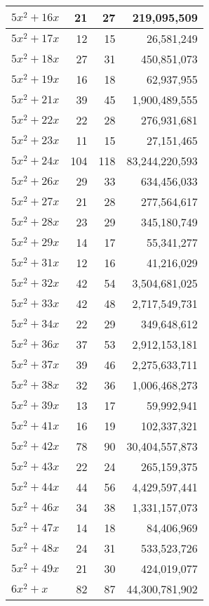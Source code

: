 \documentclass[a4paper]{amsproc}
\theoremstyle{plain}
\theoremstyle{named}
\begin{document}
\begin{longtable}{ | l | r | r | r | }
$5x^2 + 16x$ & 21 & 27 & 219{,}095{,}509 \\ \hline
$5x^2 + 17x$ & 12 & 15 & 26{,}581{,}249 \\ \hline
$5x^2 + 18x$ & 27 & 31 & 450{,}851{,}073 \\ \hline
$5x^2 + 19x$ & 16 & 18 & 62{,}937{,}955 \\ \hline
$5x^2 + 21x$ & 39 & 45 & 1{,}900{,}489{,}555 \\ \hline
$5x^2 + 22x$ & 22 & 28 & 276{,}931{,}681 \\ \hline
$5x^2 + 23x$ & 11 & 15 & 27{,}151{,}465 \\ \hline
$5x^2 + 24x$ & 104 & 118 & 83{,}244{,}220{,}593 \\ \hline
$5x^2 + 26x$ & 29 & 33 & 634{,}456{,}033 \\ \hline
$5x^2 + 27x$ & 21 & 28 & 277{,}564{,}617 \\ \hline
$5x^2 + 28x$ & 23 & 29 & 345{,}180{,}749 \\ \hline
$5x^2 + 29x$ & 14 & 17 & 55{,}341{,}277 \\ \hline
$5x^2 + 31x$ & 12 & 16 & 41{,}216{,}029 \\ \hline
$5x^2 + 32x$ & 42 & 54 & 3{,}504{,}681{,}025 \\ \hline
$5x^2 + 33x$ & 42 & 48 & 2{,}717{,}549{,}731 \\ \hline
$5x^2 + 34x$ & 22 & 29 & 349{,}648{,}612 \\ \hline
$5x^2 + 36x$ & 37 & 53 & 2{,}912{,}153{,}181 \\ \hline
$5x^2 + 37x$ & 39 & 46 & 2{,}275{,}633{,}711 \\ \hline
$5x^2 + 38x$ & 32 & 36 & 1{,}006{,}468{,}273 \\ \hline
$5x^2 + 39x$ & 13 & 17 & 59{,}992{,}941 \\ \hline
$5x^2 + 41x$ & 16 & 19 & 102{,}337{,}321 \\ \hline
$5x^2 + 42x$ & 78 & 90 & 30{,}404{,}557{,}873 \\ \hline
$5x^2 + 43x$ & 22 & 24 & 265{,}159{,}375 \\ \hline
$5x^2 + 44x$ & 44 & 56 & 4{,}429{,}597{,}441 \\ \hline
$5x^2 + 46x$ & 34 & 38 & 1{,}331{,}157{,}073 \\ \hline
$5x^2 + 47x$ & 14 & 18 & 84{,}406{,}969 \\ \hline
$5x^2 + 48x$ & 24 & 31 & 533{,}523{,}726 \\ \hline
$5x^2 + 49x$ & 21 & 30 & 424{,}019{,}077 \\ \hline
$6x^2 + x$ & 82 & 87 & 44{,}300{,}781{,}902 \\ \hline

\end{longtable}
\end{document}
